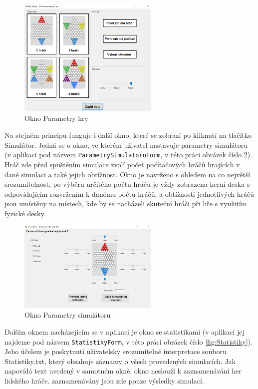 \begin{figure}
	\centering
	\includegraphics[width=0.6\textwidth]{Figures/ParametryHry.png}
	\caption{Okno \textsf{Parametry hry}}
    \label{fig:ParametryHry}
\end{figure}

Na stejném principu funguje i další okno, které se zobrazí po kliknutí na tlačítko \textsf{Simulátor}. Jedná se o okno, ve kterém uživatel nastavuje parametry simulátoru (v aplikaci pod názvem \lstinline$ParametrySimulatoruForm$, v této práci obrázek číslo \ref{fig:ParametrySimulatoru}). Hráč zde před spuštěním simulace zvolí počet počítačových hráčů hrajících v dané simulaci a také jejich obtížnost. Okno je navrženo s ohledem na co největší srozumitelnost, po výběru určitého počtu hráčů je vždy zobrazena herní deska s odpovídajícím rozvržením k danému počtu hráčů, a obtížnosti jednotlivých hráčů jsou umístěny na místech, kde by se nacházeli skuteční hráči při hře s využitím fyzické desky.

\begin{figure}
	\centering
	\includegraphics[width=0.6\textwidth]{Figures/ParametrySimulatoru.png}
	\caption{Okno \textsf{Parametry simulátoru}}
    \label{fig:ParametrySimulatoru}
\end{figure}
Dalším oknem nacházejícím se v aplikaci je okno se statistikami (v aplikaci jej najdeme pod názvem \lstinline$StatistikyForm$, v této práci obrázek číslo \ref{fig:Statistiky}). Jeho účelem je poskytnutí uživatelsky srozumitelné interpretace souboru \textsf{Statistiky.txt}, který obsahuje záznamy o všech provedených simulacích. Jak napovídá text uvedený v samotném okně, okno neslouží k zaznamenávání her lidského hráče. zaznamenávány jsou zde pouze výsledky simulací.

